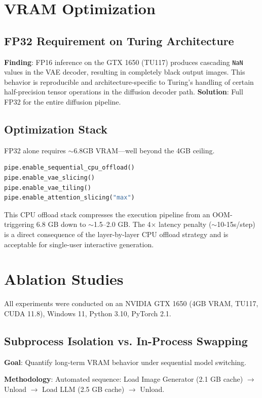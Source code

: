 \documentclass[conference]{IEEEtran}
\begin{document}
\section{VRAM Optimization}

\subsection{FP32 Requirement on Turing Architecture}
\textbf{Finding}: FP16 inference on the GTX 1650 (TU117) produces cascading \texttt{NaN} values in the VAE decoder, resulting in completely black output images. This behavior is reproducible and architecture-specific to Turing's handling of certain half-precision tensor operations in the diffusion decoder path. \textbf{Solution}: Full FP32 for the entire diffusion pipeline.

\subsection{Optimization Stack}
FP32 alone requires $\sim$6.8GB VRAM---well beyond the 4GB ceiling. 

\begin{lstlisting}[language=Python]
pipe.enable_sequential_cpu_offload()
pipe.enable_vae_slicing()
pipe.enable_vae_tiling()
pipe.enable_attention_slicing("max")
\end{lstlisting}

This CPU offload stack compresses the execution pipeline from an OOM-triggering 6.8 GB down to $\sim$1.5--2.0 GB. The 4$\times$ latency penalty ($\sim$10-15s/step) is a direct consequence of the layer-by-layer CPU offload strategy and is acceptable for single-user interactive generation.

\section{Ablation Studies}
All experiments were conducted on an NVIDIA GTX 1650 (4GB VRAM, TU117, CUDA 11.8), Windows 11, Python 3.10, PyTorch 2.1.

\subsection{Subprocess Isolation vs. In-Process Swapping}
\textbf{Goal}: Quantify long-term VRAM behavior under sequential model switching. 

\textbf{Methodology}: Automated sequence: Load Image Generator (2.1 GB cache) $\rightarrow$ Unload $\rightarrow$ Load LLM (2.5 GB cache) $\rightarrow$ Unload.
\end{document}

